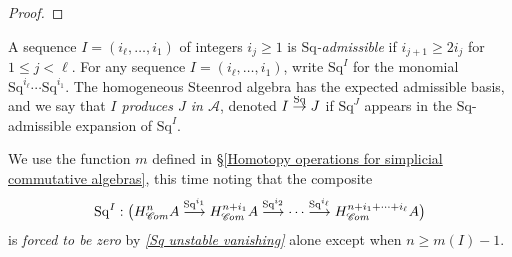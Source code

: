 \documentclass[11pt]{amsart} \renewcommand{\baselinestretch}{1.2}
\theoremstyle{plain}
\numberwithin{equation}{section} %
\theoremstyle{plain}
\numberwithin{equation}{chapter} %
\renewcommand{\to}{\longrightarrow}
\newcommand{\scrC}{\mathscr{C}}
\newcommand{\calA}{\mathcal{A}}
\newcommand{\minDimDelta}{m}
\newcommand{\produces}[3]{#3:#1\sim #2}
\renewcommand{\produces}[3]{#1\rightarrow_{#3} #2}%
\renewcommand{\produces}[3]{#1\overset{\smash{#3}}{\rightarrow} #2}%
\newcommand{\Sq}{\mathrm{Sq}}
\newcommand{\LieSteen}{\calA}
\newcommand{\algs}{{\scrC\!\textit{\normalfont\textit{om}}}}
\begin{document}
\begin{Constructing cohomology operations}
\begin{proof}
\end{proof}
A sequence $I=(i_\ell,\ldots,i_1)$ of integers $i_j\geq1$ is \emph{$\Sq$-admissible} if $i_{j+1}\geq 2i_j$ for $1\leq j <\ell$. For any sequence $I=(i_\ell,\ldots,i_1)$, write $\Sq^I$ for the monomial $\Sq^{i_\ell}\cdots \Sq^{i_1}$. The homogeneous Steenrod algebra has the expected admissible basis, and we say that \emph{$I$ produces $J$ in $\LieSteen$}, denoted $\produces{I}{J}{\Sq}$ if $\Sq^J$ appears in the $\Sq$-admissible expansion of $\Sq^I$.

We use the function $\minDimDelta$ defined in \S\ref{Homotopy operations for simplicial commutative algebras}, this time  noting that the composite 
\[\Sq^I:\bigl(H_{\algs}^{n}A\overset{\Sq^{i_1}}{\to}H_{\algs}^{n+i_1}A\overset{\Sq^{i_2}}{\to}\cdots \overset{\Sq^{i_\ell}}{\to}H_{\algs}^{n+i_1+\cdots +i_\ell}A\bigr)\]
is \emph{forced to be zero} by \emph{\ref{Sq unstable vanishing}} alone except  when $n\geq\minDimDelta(I)-1$.



\end{Constructing cohomology operations}
\end{document}
